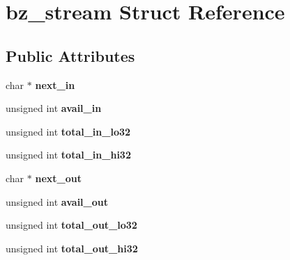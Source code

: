 \hypertarget{structbz__stream}{\section{bz\-\_\-stream Struct Reference}
\label{structbz__stream}
}
\subsection*{Public Attributes}
\begin{DoxyCompactItemize}
\item 
\hypertarget{structbz__stream_aa4a76b5c671cc4092ad7417f2731b894}{char $\ast$ {\bfseries next\-\_\-in}}\label{structbz__stream_aa4a76b5c671cc4092ad7417f2731b894}

\item 
\hypertarget{structbz__stream_a3b4296261f93965fc477277c410603af}{unsigned int {\bfseries avail\-\_\-in}}\label{structbz__stream_a3b4296261f93965fc477277c410603af}

\item 
\hypertarget{structbz__stream_aacacdc7f753d7eab8652592bd15dbe6e}{unsigned int {\bfseries total\-\_\-in\-\_\-lo32}}\label{structbz__stream_aacacdc7f753d7eab8652592bd15dbe6e}

\item 
\hypertarget{structbz__stream_af5833cfbe5e07a89c9f33783f323c218}{unsigned int {\bfseries total\-\_\-in\-\_\-hi32}}\label{structbz__stream_af5833cfbe5e07a89c9f33783f323c218}

\item 
\hypertarget{structbz__stream_ad27d0acafb3b84aada276b157e9aef04}{char $\ast$ {\bfseries next\-\_\-out}}\label{structbz__stream_ad27d0acafb3b84aada276b157e9aef04}

\item 
\hypertarget{structbz__stream_a749a8dd37243c6b76f81de5cd2a24e2e}{unsigned int {\bfseries avail\-\_\-out}}\label{structbz__stream_a749a8dd37243c6b76f81de5cd2a24e2e}

\item 
\hypertarget{structbz__stream_a7befd6f6ace94f7df3aac07ad48f944b}{unsigned int {\bfseries total\-\_\-out\-\_\-lo32}}\label{structbz__stream_a7befd6f6ace94f7df3aac07ad48f944b}

\item 
\hypertarget{structbz__stream_a8906ddf3e4fcc6963ef6680157647001}{unsigned int {\bfseries total\-\_\-out\-\_\-hi32}}\label{structbz__stream_a8906ddf3e4fcc6963ef6680157647001}


\end{DoxyCompactItemize}
